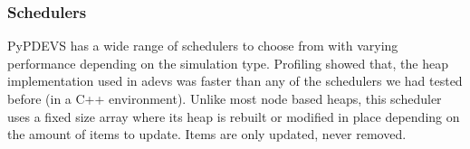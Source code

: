 \subsubsection{Schedulers}
PyPDEVS has a wide range of schedulers to choose from with varying performance depending on the simulation type. Profiling showed that, the heap implementation used in adevs was faster than any of the schedulers we had tested before (in a C++ environment). Unlike most node based heaps, this scheduler uses a fixed size array where its heap is rebuilt or modified in place depending on the amount of items to update. Items are only updated, never removed.
